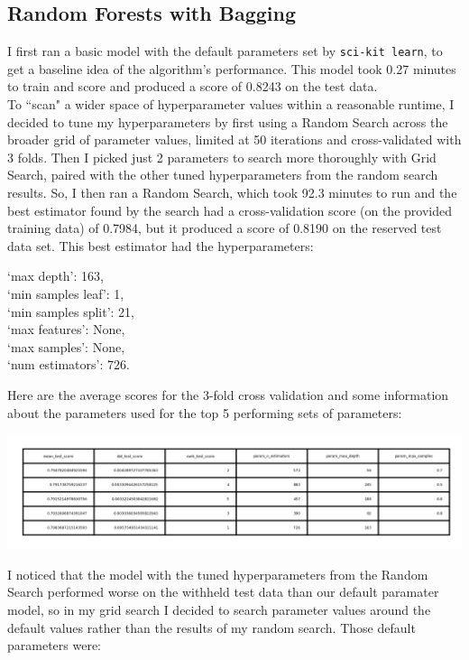 \documentclass{article}
\begin{document}
\subsection{Random Forests with Bagging}
I first ran a basic model with the default parameters set by \texttt{sci-kit learn}, to get a baseline idea of the algorithm's performance. This model took 0.27 minutes to train and score and produced a score of 0.8243 on the test data.
\bigskip \\To ``scan" a wider space of hyperparameter values within a reasonable runtime, I decided to tune my hyperparameters by first using a Random Search across the broader grid of parameter values, limited at 50 iterations and cross-validated with 3 folds. Then I picked just 2 parameters to search more thoroughly with Grid Search, paired with the other tuned hyperparameters from the random search results. So, I then ran a Random Search, which took 92.3 minutes to run and the best estimator found by the search had a cross-validation score (on the provided training data) of 0.7984, but it produced a score of 0.8190 on the reserved test data set. This best estimator had the hyperparameters: 
\begin{center}
 `max depth': 163, 
 \\`min samples leaf': 1, 
 \\`min samples split': 21, 
 \\`max features': None, 
 \\`max samples': None, 
 \\`num estimators': 726. 
 \end{center}
Here are the average scores for the 3-fold cross validation and some information about the parameters used for the top 5 performing sets of parameters: 
\begin{center}
\includegraphics[scale=1.2]{RandomForestRandomSearchTable.png}
\end{center}
I noticed that the model with the tuned hyperparameters from the Random Search performed worse on the withheld test data than our default paramater model, so in my grid search I decided to search parameter values around the default values rather than the results of my random search. Those default parameters were:
\end{document}
